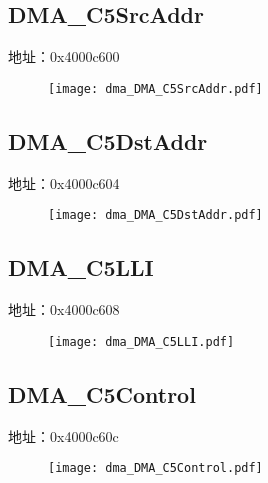 \subsection{DMA\_C5SrcAddr}
\label{dma-DMA-C5SrcAddr}
地址：0x4000c600
 \begin{figure}[H]
\texttt{[image: dma\_DMA\_C5SrcAddr.pdf]}
\end{figure}

\subsection{DMA\_C5DstAddr}
\label{dma-DMA-C5DstAddr}
地址：0x4000c604
 \begin{figure}[H]
\texttt{[image: dma\_DMA\_C5DstAddr.pdf]}
\end{figure}

\subsection{DMA\_C5LLI}
\label{dma-DMA-C5LLI}
地址：0x4000c608
 \begin{figure}[H]
\texttt{[image: dma\_DMA\_C5LLI.pdf]}
\end{figure}

\subsection{DMA\_C5Control}
\label{dma-DMA-C5Control}
地址：0x4000c60c
 \begin{figure}[H]
\texttt{[image: dma\_DMA\_C5Control.pdf]}
\end{figure}

